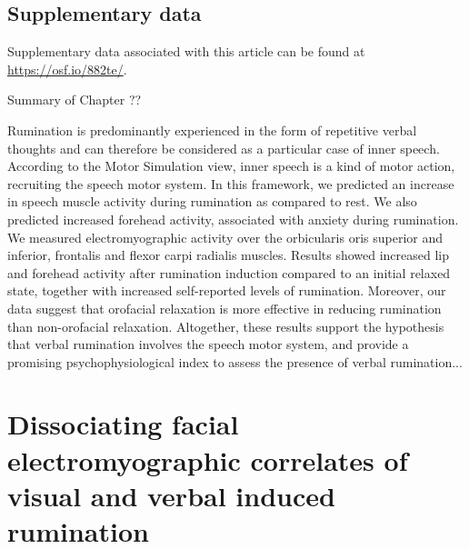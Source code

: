 \documentclass[a4paper,12pt,twoside,openright,oldfontcommands]{memoir}
\newcommand\getcurrentref[1]{
 \ifnumequal{\value{#1}}{0}
  {??}
  {\the\value{#1}}
}
\begin{document}
\hypertarget{suppCH3}{%
\section{Supplementary data}\label{suppCH3}}

Supplementary data associated with this article can be found at \url{https://osf.io/882te/}.

\newpage

\begin{vplace}[1]

\begin{summary}{Summary of Chapter\getcurrentref{chapter}}

Rumination is predominantly experienced in the form of repetitive verbal thoughts and can therefore be considered as a particular case of inner speech. According to the Motor Simulation view, inner speech is a kind of motor action, recruiting the speech motor system. In this framework, we predicted an increase in speech muscle activity during rumination as compared to rest. We also predicted increased forehead activity, associated with anxiety during rumination. We measured electromyographic activity over the orbicularis oris superior and inferior, frontalis and flexor carpi radialis muscles. Results showed increased lip and forehead activity after rumination induction compared to an initial relaxed state, together with increased self-reported levels of rumination. Moreover, our data suggest that orofacial relaxation is more effective in reducing rumination than non-orofacial relaxation. Altogether, these results support the hypothesis that verbal rumination involves the speech motor system, and provide a promising psychophysiological index to assess the presence of verbal rumination...

\end{summary}

\end{vplace}

\hypertarget{chap4}{%
\chapter{Dissociating facial electromyographic correlates of visual and verbal induced rumination}\label{chap4}}
\end{document}
